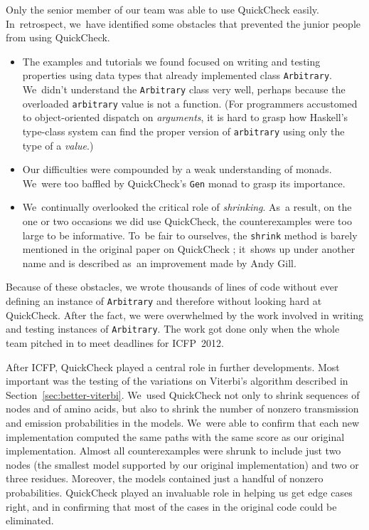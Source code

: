 \documentclass[]{jfp1}
\newcommand\secref[1]{Section~\ref{sec:#1}}
\newcommand\seclabel[1]{\label{sec:#1}}
\let\cite\citep
\begin{document}
\seclabel{awkward-quickcheck}

Only the senior member of our team was able to use
QuickCheck easily.
In~retrospect, we~have identified some obstacles that prevented the
junior people from using
QuickCheck.
\begin{itemize}
\item
The examples and tutorials we found focused 
on writing and testing properties using data types that
already implemented class \texttt{Arbitrary}.
We~didn't understand the \texttt{Arbitrary} class very well, 
perhaps because the overloaded \texttt{arbitrary} value is not a
function.
(For programmers accustomed to object-oriented dispatch
on \emph{arguments}, it is hard to grasp how Haskell's type-class
system can find the proper version
of \texttt{arbitrary} using only the type of a \emph{value}.)
\item
Our difficulties were compounded by a weak understanding of monads.
We~were too baffled by QuickCheck's \texttt{Gen} monad to grasp its
importance.
\item
We~continually overlooked the critical role of \emph{shrinking}.
As~a result, on the one or two occasions we did 
use QuickCheck, the counterexamples were too large to be
informative. 
To~be fair to ourselves, the \texttt{shrink} method is barely
mentioned in the original 
paper on QuickCheck \cite{claessen:quickcheck};
it~shows up under another name and is described as~an improvement made
by Andy Gill. 
\end{itemize}
Because of these obstacles, 
we wrote thousands of lines of code without ever defining an instance
of \texttt{Arbitrary} and therefore
without looking hard at QuickCheck.
After the fact, we were overwhelmed by the work
involved in writing and testing instances
of
\texttt{Arbitrary}.
The work got done only when the whole team pitched in to
meet deadlines for ICFP~2012.

After ICFP, 
QuickCheck played a central role in further developments.
Most important was the testing of the variations on Viterbi's
algorithm described in \secref{better-viterbi}.
We~used QuickCheck not only to shrink sequences of nodes and of amino
acids, but also to shrink the number of nonzero transmission and
emission probabilities in the models.
We~were able to confirm that each new implementation computed the same
paths with the same score as our original implementation.
Almost all counterexamples were shrunk to include just two nodes 
(the smallest model supported by our original implementation)
and two or three residues.
Moreover, the models contained just a handful of nonzero
probabilities.
QuickCheck played an invaluable role in helping us get edge cases
right, and in confirming that most of the cases in the original code
could be eliminated.
\end{document}

